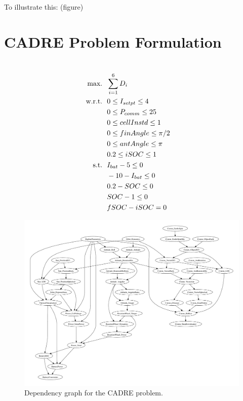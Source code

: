 \documentclass[]{aiaa-tc} %
\newcommand{\txt}{\textrm}
\begin{document}
    To illustrate this: (figure)
    
  \section{CADRE Problem Formulation}

    \begin{align}
        \\\txt{max.} &\ \ \sum_{i=1}^6 D_i \notag
        \\\txt{w.r.t.} & \ \ 0 \le I_{setpt} \le 4 \notag
        \\     & \ \ 0 \le P_{comm} \le 25 \notag
        \\     & \ \ 0 \le cellInstd \le 1 \notag
        \\     & \ \ 0 \le finAngle \le \pi/2 \notag
        \\     & \ \ 0 \le antAngle \le \pi \notag
        \\     & \ \ 0.2 \le iSOC \le 1 \notag
        \\\txt{s.t.} & \ \ I_{bat} - 5 \le 0 \notag
        \\     & \ \ -10 - I_{bat} \le 0 \notag
        \\     & \ \ 0.2 - SOC \le 0 \notag
        \\     & \ \ SOC - 1 \le 0 \notag
        \\     & \ \ fSOC - iSOC = 0 \notag
        \label{eqn:sellar_formulation}
    \end{align}


    \begin{figure}[!htb]\begin{center}
      \includegraphics[width=1.1\textwidth]{images/CADRE.pdf}
      \caption{ Dependency graph for the CADRE problem. \label{fig:cadre_graph}}
    \end{center}\end{figure}
\end{document}
